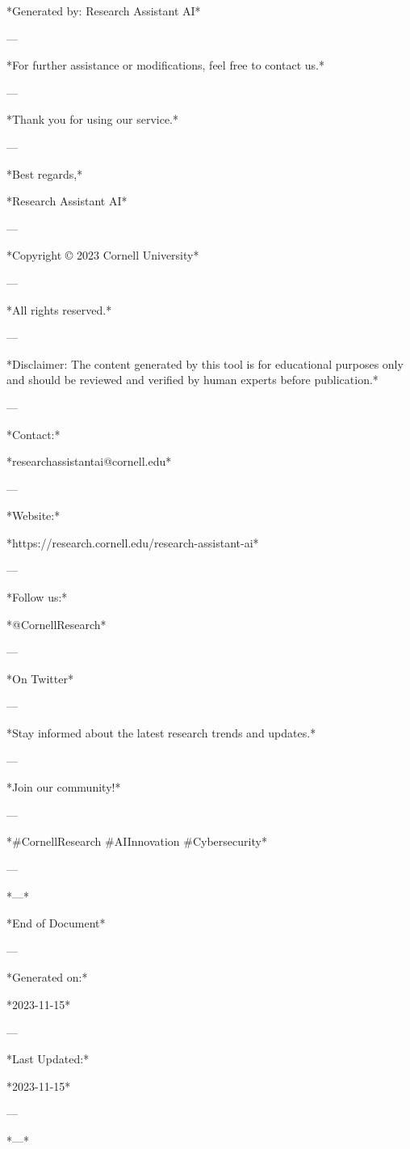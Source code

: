 *Generated by: Research Assistant AI* 

--- 

*For further assistance or modifications, feel free to contact us.* 

--- 

*Thank you for using our service.* 

--- 

*Best regards,* 

*Research Assistant AI* 

--- 

*Copyright © 2023 Cornell University* 

--- 

*All rights reserved.* 

--- 

*Disclaimer: The content generated by this tool is for educational purposes only and should be reviewed and verified by human experts before publication.* 

--- 

*Contact:* 

*researchassistantai@cornell.edu* 

--- 

*Website:* 

*https://research.cornell.edu/research-assistant-ai* 

--- 

*Follow us:* 

*@CornellResearch* 

--- 

*On Twitter* 

--- 

*Stay informed about the latest research trends and updates.* 

--- 

*Join our community!* 

--- 

*#CornellResearch #AIInnovation #Cybersecurity* 

--- 

*---* 

*End of Document* 

--- 

*Generated on:* 

*2023-11-15* 

--- 

*Last Updated:* 

*2023-11-15* 

--- 

*---* 

